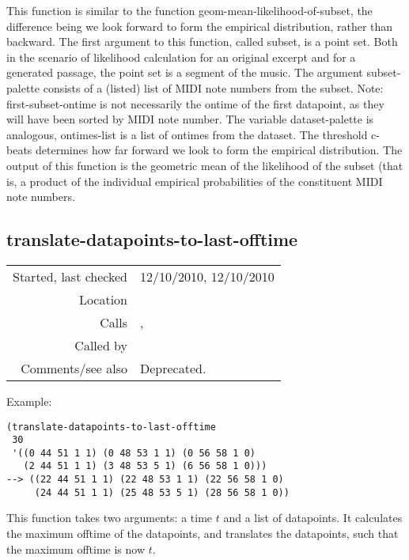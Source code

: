 \noindent This function is similar to the function
geom-mean-likelihood-of-subset, the difference being
we look forward to form the empirical distribution,
rather than backward. The first argument to
this function, called subset, is a point set. Both in
the scenario of likelihood calculation for an original
excerpt and for a generated passage, the point set is
a segment of the music. The argument subset-palette
consists of a (listed) list of MIDI note numbers from
the subset. Note: first-subset-ontime is not
necessarily the ontime of the first datapoint, as they
will have been sorted by MIDI note number. The
variable dataset-palette is analogous, ontimes-list is
a list of ontimes from the dataset. The threshold
c-beats determines how far forward we look to form the
empirical distribution. The output of this function is
the geometric mean of the likelihood of the subset
(that is, a product of the individual empirical
probabilities of the constituent MIDI note numbers.


\subsection*{translate-datapoints-to-last-offtime}\label{fun:translate-datapoints-to-last-offtime}

\vspace{0.3cm}
\begin{tabular}{r|p{8cm}}
Started, last checked & 12/10/2010, 12/10/2010 \\
Location & \nameref{sec:generating-beat-MNN-spacing-backwards} \\
Calls & \nameref{fun:constant-vector}, \nameref{fun:translation} \\
Called by & \\
Comments/see also & Deprecated.
\end{tabular}

\vspace{0.5cm}
\noindent Example:
\begin{verbatim}
(translate-datapoints-to-last-offtime
 30
 '((0 44 51 1 1) (0 48 53 1 1) (0 56 58 1 0)
   (2 44 51 1 1) (3 48 53 5 1) (6 56 58 1 0)))
--> ((22 44 51 1 1) (22 48 53 1 1) (22 56 58 1 0)
     (24 44 51 1 1) (25 48 53 5 1) (28 56 58 1 0))
\end{verbatim}

\noindent This function takes two arguments: a time
$t$ and a list of datapoints. It calculates the
maximum offtime of the datapoints, and translates the
datapoints, such that the maximum offtime is now
$t$.


